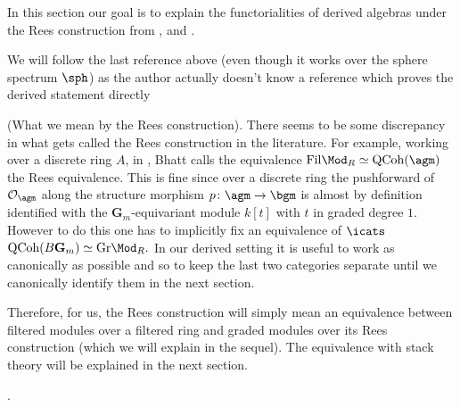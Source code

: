 \documentclass[10pt,reqno]{amsart}
\numberwithin{equation}{section}
\newcommand{\cO}{{\mathcal{O}}}
\newcommand{\G}{\mathbf{G}}
\newcommand{\Qcoh}{\mathrm{QCoh}}
\newcommand{\Gr}{\mathrm{Gr}}
\newcommand{\fil}{\mathrm{Fil}}
\begin{document}
In this section our goal is to explain the functorialities of derived algebras under the Rees construction from \cite[\S~5]{Simpson1997HodgeFiltrationNonabelian}, \cite[\S~2.2.1]{Bhatt22} and \cite[\S~3.1]{Lurie2015RotationInvarianceKTheory}.


We will follow the last reference above (even though it works over the sphere spectrum $\sph$) as the author actually doesn't know a reference which proves the derived statement directly

\begin{remark}(What we mean by the Rees construction).\label{remark: what we mean by rees}
    There seems to be some discrepancy in what gets called the Rees construction in the literature. For example, working over a discrete ring $A$, in \cite{Bhatt22}, Bhatt calls the equivalence $\fil\Mod_R\simeq \Qcoh(\agm)$ the Rees equivalence. This is fine since over a discrete ring the pushforward of $\cO_{\agm}$ along the structure morphism $p\colon \agm\to \bgm$ is almost by definition identified with the $\G_m$-equivariant module $k[t]$ with $t$ in graded degree $1.$ However to do this one has to implicitly fix an equivalence of $\icats$ $\Qcoh(B\G_m)\simeq \Gr\Mod_R.$ In our derived setting it is useful to work as canonically as possible and so to keep the last two categories separate until we canonically identify them in the next section. 

   Therefore, for us, the Rees construction will simply mean an equivalence between filtered modules over a filtered ring and graded modules over its Rees construction (which we will explain in the sequel). The equivalence with stack theory will be explained in the next section.
\end{remark}.
\end{document}

